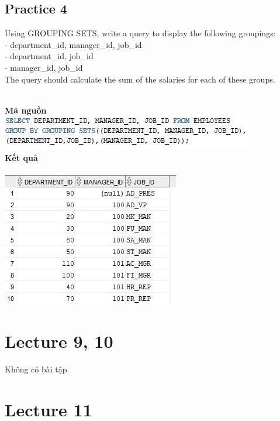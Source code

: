 \documentclass[12pt,a4paper]{report}
\begin{document}
\subsection{Practice 4}
\begin{boxedminipage}[t]{15.5cm}
	Using GROUPING SETS, write a query to display the following groupings:\\
	- department\_id, manager\_id, job\_id\\
	- department\_id, job\_id\\
	- manager\_id, job\_id\\
	The query should calculate the sum of the salaries for each of these groups.
	
	
\end{boxedminipage}
\newline
\\
\textbf{Mã nguồn}
\\
\newline
\includegraphics[scale=1]{48.jpg}\\
\textbf{Kết quả}\\\\
\includegraphics[scale=1]{k48.jpg}

\section{Lecture 9, 10}
Không có bài tập.

\section{Lecture 11}
\end{document}
